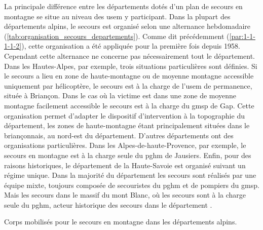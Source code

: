 La principale différence entre les départements dotés d'un plan de
secours en montagne se situe au niveau des \ac{usem} y
participant. Dans la plupart des départements alpins, le secours est
organisé selon une alternance hebdomadaire
(\autoref{tab:organisation_secours_departements}). Comme dit
précédemment (\ref{par:1-1-1-1-2}), cette organisation a été appliquée
pour la première fois depuis 1958. Cependant cette alternance ne
concerne pas nécessairement tout le département. Dans les
Hautes-Alpes, par exemple, trois situations particulières sont
définies. Si le secours a lieu en zone de haute-montagne ou de moyenne
montagne accessible uniquement par hélicoptère, le secours est à la
charge de l'\ac{usem} de permanence, située à Briançon. Dans le cas où
la victime est dans une zone de moyenne montagne facilement accessible
le secours est à la charge du \ac{gmsp} de Gap. Cette organisation
permet d'adapter le dispositif d’intervention à la topographie du
département, les zones de haute-montagne étant principalement situées
dans le briançonnais, au nord-est du département. D'autres
départements ont des organisations particulières. Dans les
Alpes-de-haute-Provence, par exemple, le secours en montagne est à la
charge seule du \ac{pghm} de Jausiers. Enfin, pour des raisons
historiques, le département de la Haute-Savoie est organisé suivant un
régime unique. Dans la majorité du département les secours sont
réalisés par une équipe mixte, toujours composée de secouristes du
\ac{pghm} et de pompiers du \ac{gmsp}. Mais les secours dans le massif
du mont Blanc, où les secours sont à la charge seule du \ac{pghm},
acteur historique des secours dans le département
\autocite{Halle2007,Boillot2017}.

\begin{table}
  \centering
  
  \caption{Corps mobilisés pour le secours en montagne dans les
    départements alpins.}
  \label{tab:organisation_secours_departements}
\end{table}

